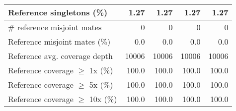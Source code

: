 \documentclass[12pt,a4paper]{article}
\begin{document}
\begin{table}[ht]
\begin{center}
\begin{tabular}{|l*{4}{|r}|}
Reference singletons (\%) & 1.27 & 1.27 & 1.27 & 1.27 \\ \hline
\# reference misjoint mates & 0 & 0 & 0 & 0 \\ \hline
Reference misjoint mates (\%) & 0.0 & 0.0 & 0.0 & 0.0 \\ \hline
Reference avg. coverage depth & 10006 & 10006 & 10006 & 10006 \\ \hline
Reference coverage $\geq$ 1x (\%) & 100.0 & 100.0 & 100.0 & 100.0 \\ \hline
Reference coverage $\geq$ 5x (\%) & 100.0 & 100.0 & 100.0 & 100.0 \\ \hline
Reference coverage $\geq$ 10x (\%) & 100.0 & 100.0 & 100.0 & 100.0 \\ \hline
\end{tabular}
\end{center}
\end{table}
\end{document}
